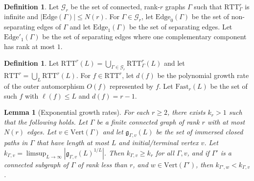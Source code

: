 \documentclass[11pt,oneside]{amsart}
\newtheorem{lem}[thm]{Lemma}
\theoremstyle{definition}
\newtheorem{defn}[thm]{Definition}
\newcommand{\gate}{\mathfrak g}
\newcommand{\vertices}{\mathrm{Vert}}
\newcommand{\edges}{\mathrm{Edge}}
\newcommand{\ttm}{\mathrm{RTT}}
\newcommand{\Fast}{\mathrm{Fast}}
\begin{document}
\begin{defn}\label{defn:ttm-graphs}
Let $\mathcal G_r$ be the set of connected, rank-$r$ graphs $\Gamma$ such that $\ttm^r_\Gamma$ is infinite and $|\edges(\Gamma)|\leq N(r)$.  For $\Gamma\in\mathcal G_r$, let $\edges_0(\Gamma)$ be the set of non-separating edges of $\Gamma$ and let $\edges_1(\Gamma)$ be the set of separating edges.  Let $\edges'_1(\Gamma)$ be the set of separating edges where one complementary component has rank at most $1$.
\end{defn}

\begin{defn}\label{defn:train-track-counting-sets}
Let $\ttm^r(L)=\bigcup_{\Gamma\in\mathcal G_r}\ttm_\Gamma^r(L)$ and let $\ttm^r=\bigcup_L\ttm^r(L)$.  For $f\in \ttm^r$, let $d(f)$ be the polynomial growth rate of the outer automorphism $O(f)$ represented by $f$.  Let $\Fast_{r}(L)$ be the set of such $f$ with $\ell(f)\leq L$ and $d(f)=r-1$.
\end{defn}

\begin{lem}[Exponential growth rates]\label{lem:graph-rank-growth}
For each $r\geq 2$, there exists $k_r>1$ such that the following holds.  Let $\Gamma$ be a finite connected graph of rank $r$ with at most $N(r)$ edges.  Let $v\in\vertices(\Gamma)$ and let $\gate_{\Gamma,v}(L)$ be the set of immersed closed paths in $\Gamma$ that have length at most $L$ and initial/terminal vertex $v$.  Let $k_{\Gamma,v}=\limsup_{L\to\infty}|\gate_{\Gamma,v}(L)^{1/L}|$.  Then $k_{\Gamma,v}\geq k_r$ for all $\Gamma,v$, and if $\Gamma'$ is a connected subgraph of $\Gamma$ of rank less than $r$, and $w\in\vertices(\Gamma')$, then $k_{\Gamma',w}<k_{\Gamma,v}$.
\end{lem}
\end{document}

